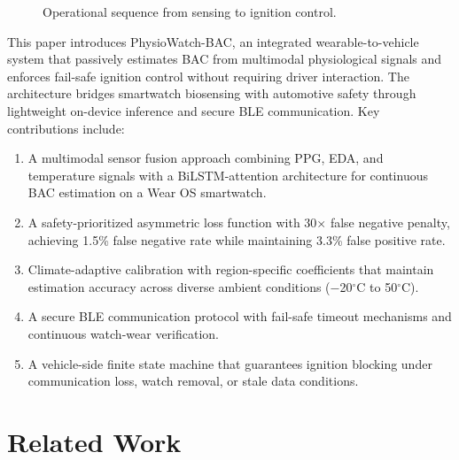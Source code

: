 \documentclass[HARVARD,Times2COL]{WileyNJDv5}
\begin{document}
\begin{figure}[t]
\centering

\caption{Operational sequence from sensing to ignition control.}
\label{fig:sequence}
\end{figure}
This paper introduces PhysioWatch-BAC, an integrated wearable-to-vehicle system that passively estimates BAC from multimodal physiological signals and enforces fail-safe ignition control without requiring driver interaction. The architecture bridges smartwatch biosensing with automotive safety through lightweight on-device inference and secure BLE communication. Key contributions include:
\begin{enumerate}
    \item A multimodal sensor fusion approach combining PPG, EDA, and temperature signals with a BiLSTM-attention architecture for continuous BAC estimation on a Wear OS smartwatch.
    \item A safety-prioritized asymmetric loss function with 30$\times$ false negative penalty, achieving 1.5\% false negative rate while maintaining 3.3\% false positive rate.
    \item Climate-adaptive calibration with region-specific coefficients that maintain estimation accuracy across diverse ambient conditions ($-$20$^\circ$C to 50$^\circ$C).
    \item A secure BLE communication protocol with fail-safe timeout mechanisms and continuous watch-wear verification.
    \item A vehicle-side finite state machine that guarantees ignition blocking under communication loss, watch removal, or stale data conditions.
\end{enumerate}
\section{Related Work} \label{sec21}
\end{document}
